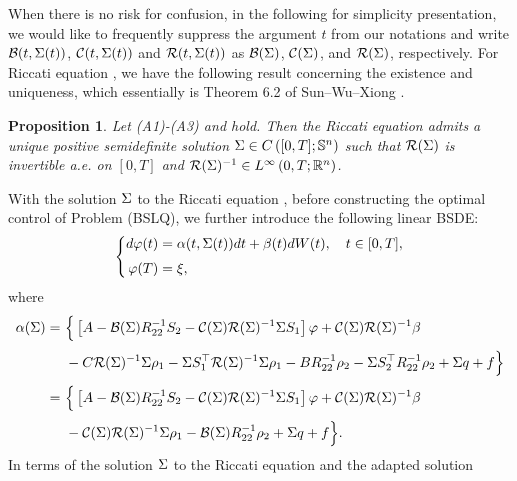 \documentclass[11pt,times,twoside]{article}
\def\a{\alpha}        \def\G{\Gamma}   \def\g{\gamma}   \def\O{\Omega}   \def\o{\omega}
\newtheorem{proposition}[theorem]{Proposition}
\begin{document}
%
When there is no risk for confusion, in the following for simplicity presentation, we would like to frequently suppress the argument $t$ from our notations and write $\mathcal{B}(t,\Sigma(t))$, $\mathcal{C}(t,\Sigma(t))$ and $\mathcal{R}(t,\Sigma(t))$ as $\mathcal{B}(\Sigma)$, $\mathcal{C}(\Sigma)$, and $\mathcal{R}(\Sigma)$, respectively. For Riccati equation , we have the following result concerning the existence and uniqueness, which essentially is Theorem 6.2 of Sun--Wu--Xiong \cite{Sun-Wu-Xiong2021}.


\begin{proposition}
Let (A1)-(A3) and  hold. Then the Riccati equation  admits a unique positive semidefinite solution $\Sigma \in C\left([0, T] ; \mathbb{S}^{n}\right)$ such that $\mathcal{R}(\Sigma)$ is invertible a.e. on $[0, T]$ and $\mathcal{R}(\Sigma)^{-1} \in L^{\infty}\left(0, T ; \mathbb{R}^{n}\right)$.
\end{proposition}
%
With the solution $\Sigma$ to the Riccati equation , before constructing the optimal control of Problem (BSLQ), we further introduce the following linear BSDE:
%
\begin{equation}\label{4.3}\left\{\begin{aligned}
\ds d\varphi(t) &= \a(t,\Si(t)) d t+\beta(t) d W(t), \quad t \in[0, T], \\
\ns\ds  \varphi(T) &= \xi,
\end{aligned}\right.
\end{equation}
%
where
%
\begin{equation}\label{4.9}
\begin{aligned}
\ds \a(\Si)=&~ \Big\{ \left[A-\mathcal{B}(\Si) R_{22}^{-1} S_{2}-\mathcal{C}(\Si) \mathcal{R}(\Si)^{-1} \Si S_{1}\right] \varphi+\mathcal{C}(\Si) \mathcal{R}(\Si)^{-1} \beta \\
%
\ns\ds &~ -C \mathcal{R}(\Si)^{-1}\Si\rho_1
-\Si S_{1}^{\top} \mathcal{R}(\Si)^{-1} \Si\rho_1
-BR_{22}^{-1}\rho_2
-\Si S_{2}^{\top} R_{22}^{-1}\rho_2+\Si q+f \Big\} \\
%
\ns\ds =&~ \Big\{ \left[A-\mathcal{B}(\Si) R_{22}^{-1} S_{2}-\mathcal{C}(\Si) \mathcal{R}(\Si)^{-1} \Si S_{1}\right] \varphi+\mathcal{C}(\Si) \mathcal{R}(\Si)^{-1} \beta \\
%
\ns\ds &~ -\cC(\Si) \mathcal{R}(\Si)^{-1}\Si\rho_1-\cB(\Si) R_{22}^{-1}\rho_2+\Si q+f \Big\}.
\end{aligned}
\end{equation}
%
In terms of the solution $\Sigma$ to the Riccati equation  and the adapted solution
\end{document}

